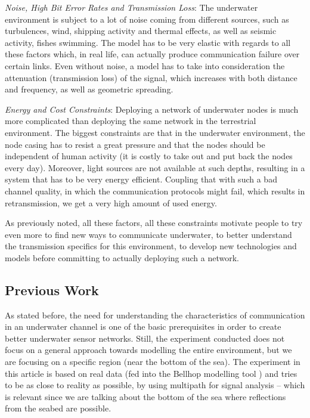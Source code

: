 \documentclass[a4paper]{IEEEtran}
\begin{document}
\textit{Noise, High Bit Error Rates and Transmission Loss}: The underwater
environment is subject to a lot of noise coming from different sources, such as
turbulences, wind, shipping activity and thermal effects, as well as seismic
activity, fishes swimming. The model has to be very elastic with regards to all
these factors which, in real life, can actually produce communication failure
over certain links. Even without noise, a model has to take into consideration
the attenuation (transmission loss) of the signal, which increases with both
distance and frequency, as well as geometric spreading.

\textit{Energy and Cost Constraints}: Deploying a network of underwater nodes is
much more complicated than deploying the same network in the terrestrial
environment. The biggest constraints are that in the underwater environment, the
node casing has to resist a great pressure and that the nodes should be
independent of human activity (it is costly to take out and put back the nodes
every day). Moreover, light sources are not available at such depths, resulting
in a system that has to be very energy efficient. Coupling that with such a bad
channel quality, in which the communication protocols might fail, which results
in retransmission, we get a very high amount of used energy.

As previously noted, all these factors, all these constraints motivate people to
try even more to find new ways to communicate underwater, to better understand
the transmission specifics for this environment, to develop new technologies and
models before committing to actually deploying such a network.

\subsection{Previous Work}
As stated before, the need for understanding the characteristics of
communication in an underwater channel is one of the basic prerequisites in
order to create better underwater sensor networks. Still, the experiment
conducted does not focus on a general approach towards modelling the entire
environment, but we are focusing on a specific region (near the bottom of the
sea). The experiment in this article is based on real data (fed into the Bellhop
modelling tool \cite{bellhop}) and tries to be as close to reality as possible,
by using multipath for signal analysis -- which is relevant since we are talking
about the bottom of the sea where reflections from the seabed are possible.
\end{document}
